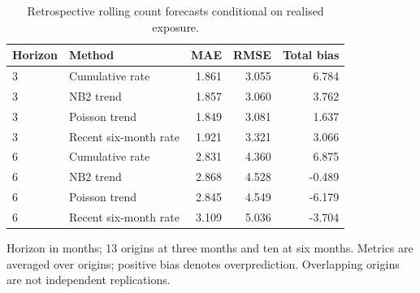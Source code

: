 \begin{table}[htbp]
\centering
\small
\caption{Retrospective rolling count forecasts conditional on realised exposure.}
\label{tab:rolling-counts}
\begin{tabular}{llrrr}
\toprule
Horizon & Method & MAE & RMSE & Total bias \\
\midrule
3 & Cumulative rate & 1.861 & 3.055 & 6.784 \\
3 & NB2 trend & 1.857 & 3.060 & 3.762 \\
3 & Poisson trend & 1.849 & 3.081 & 1.637 \\
3 & Recent six-month rate & 1.921 & 3.321 & 3.066 \\
6 & Cumulative rate & 2.831 & 4.360 & 6.875 \\
6 & NB2 trend & 2.868 & 4.528 & -0.489 \\
6 & Poisson trend & 2.845 & 4.549 & -6.179 \\
6 & Recent six-month rate & 3.109 & 5.036 & -3.704 \\
\bottomrule
\end{tabular}
\par\smallskip
{\footnotesize Horizon in months; 13 origins at three months and ten at six months. Metrics are averaged over origins; positive bias denotes overprediction. Overlapping origins are not independent replications.}
\end{table}
